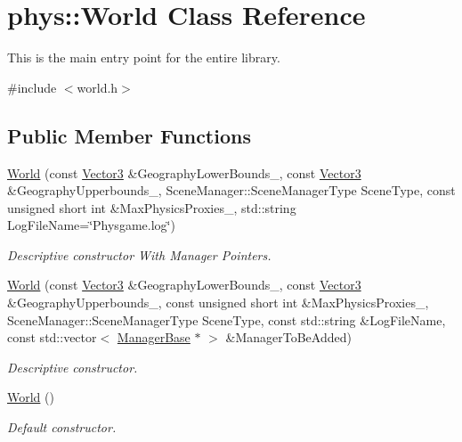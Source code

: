\hypertarget{classphys_1_1World}{
\section{phys::World Class Reference}
\label{da/ddf/classphys_1_1World}
}


This is the main entry point for the entire library.  




{\ttfamily \#include $<$world.h$>$}

\subsection*{Public Member Functions}
\begin{DoxyCompactItemize}
\item 
\hyperlink{classphys_1_1World_a87775405d6e7c8f2926fe6e4cd12de10}{World} (const \hyperlink{classphys_1_1Vector3}{Vector3} \&GeographyLowerBounds\_\-, const \hyperlink{classphys_1_1Vector3}{Vector3} \&GeographyUpperbounds\_\-, SceneManager::SceneManagerType SceneType, const unsigned short int \&MaxPhysicsProxies\_, std::string LogFileName=\char`\"{}Physgame.log\char`\"{})
\begin{DoxyCompactList}\small\item\em Descriptive constructor With Manager Pointers. \item\end{DoxyCompactList}\item 
\hyperlink{classphys_1_1World_a8518c8d24854852fb04704d808e06581}{World} (const \hyperlink{classphys_1_1Vector3}{Vector3} \&GeographyLowerBounds\_\-, const \hyperlink{classphys_1_1Vector3}{Vector3} \&GeographyUpperbounds\_\-, const unsigned short int \&MaxPhysicsProxies\_\-, SceneManager::SceneManagerType SceneType, const std::string \&LogFileName, const std::vector$<$ \hyperlink{classphys_1_1ManagerBase}{ManagerBase} $\ast$ $>$ \&ManagerToBeAdded)
\begin{DoxyCompactList}\small\item\em Descriptive constructor. \item\end{DoxyCompactList}\item 
\hyperlink{classphys_1_1World_a7f762724406c874250c3dc8910a1e695}{World} ()
\begin{DoxyCompactList}\small\item\em Default constructor. \item\end{DoxyCompactList}\item 

\end{DoxyCompactItemize}

